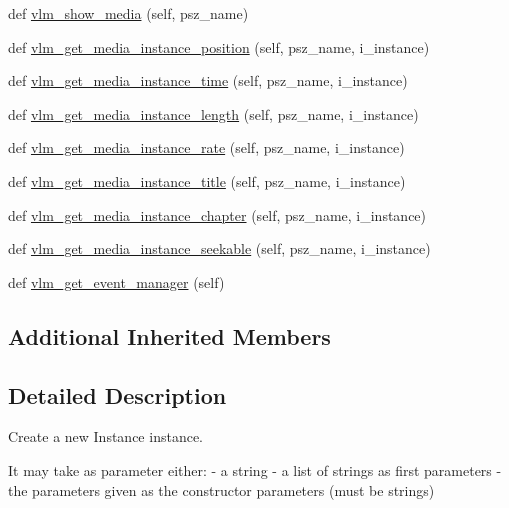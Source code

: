 \begin{DoxyCompactItemize}
\item 
def \hyperlink{classsrc_1_1lib_1_1vlc_1_1Instance_a186eb4c98eb5bb12664edf68690987d7}{vlm\+\_\+show\+\_\+media} (self, psz\+\_\+name)
\item 
def \hyperlink{classsrc_1_1lib_1_1vlc_1_1Instance_a6c2f36af97fc8d17f140e69b184ba548}{vlm\+\_\+get\+\_\+media\+\_\+instance\+\_\+position} (self, psz\+\_\+name, i\+\_\+instance)
\item 
def \hyperlink{classsrc_1_1lib_1_1vlc_1_1Instance_af4bd843db6456247187babecc0848810}{vlm\+\_\+get\+\_\+media\+\_\+instance\+\_\+time} (self, psz\+\_\+name, i\+\_\+instance)
\item 
def \hyperlink{classsrc_1_1lib_1_1vlc_1_1Instance_aa9f7c16140978618b2ee70400fa56810}{vlm\+\_\+get\+\_\+media\+\_\+instance\+\_\+length} (self, psz\+\_\+name, i\+\_\+instance)
\item 
def \hyperlink{classsrc_1_1lib_1_1vlc_1_1Instance_a3d8939ebb1774800b8d2045d50d74398}{vlm\+\_\+get\+\_\+media\+\_\+instance\+\_\+rate} (self, psz\+\_\+name, i\+\_\+instance)
\item 
def \hyperlink{classsrc_1_1lib_1_1vlc_1_1Instance_aca3ee8315660645897420e1985f2b737}{vlm\+\_\+get\+\_\+media\+\_\+instance\+\_\+title} (self, psz\+\_\+name, i\+\_\+instance)
\item 
def \hyperlink{classsrc_1_1lib_1_1vlc_1_1Instance_a7743ef391a88ddc83d5de1355fc546d8}{vlm\+\_\+get\+\_\+media\+\_\+instance\+\_\+chapter} (self, psz\+\_\+name, i\+\_\+instance)
\item 
def \hyperlink{classsrc_1_1lib_1_1vlc_1_1Instance_a2e417baee82a23c007f43a0055fa52cb}{vlm\+\_\+get\+\_\+media\+\_\+instance\+\_\+seekable} (self, psz\+\_\+name, i\+\_\+instance)
\item 
def \hyperlink{classsrc_1_1lib_1_1vlc_1_1Instance_aa1330dd3b1aa3da8b40977d36c399c4f}{vlm\+\_\+get\+\_\+event\+\_\+manager} (self)
\end{DoxyCompactItemize}
\subsection*{Additional Inherited Members}


\subsection{Detailed Description}
\begin{DoxyVerb}Create a new Instance instance.

It may take as parameter either:
  - a string
  - a list of strings as first parameters
  - the parameters given as the constructor parameters (must be strings)\end{DoxyVerb}
 

